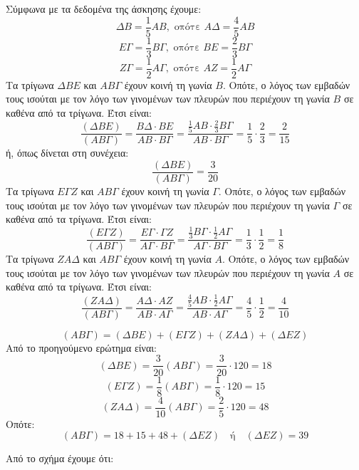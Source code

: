\begin{alist}
    \item Σύμφωνα με τα δεδομένα της άσκησης έχουμε:
    \[
    \Delta B = \frac{1}{5} AB, \text{ οπότε } A\Delta = \frac{4}{5} AB
    \]
    \[
    E\Gamma = \frac{1}{3} B\Gamma, \text{ οπότε } BE = \frac{2}{3} B\Gamma
    \]
    \[
    Z\Gamma = \frac{1}{2} A\Gamma, \text{ οπότε } AZ = \frac{1}{2} A\Gamma
    \]
    Τα τρίγωνα $\Delta BE$ και $AB\Gamma$ έχουν κοινή τη γωνία $B$. Οπότε, ο λόγος των εμβαδών τους ισούται με τον λόγο των γινομένων των πλευρών που περιέχουν τη γωνία $B$ σε καθένα από τα τρίγωνα. Έτσι είναι:
    \[
    \frac{(\Delta BE)}{(AB\Gamma)} = \frac{B\Delta \cdot BE}{AB \cdot B\Gamma} = \frac{\frac{1}{5}AB \cdot \frac{2}{3}B\Gamma}{AB \cdot B\Gamma} = \frac{1}{5} \cdot \frac{2}{3} = \frac{2}{15}
    \]
    ή, όπως δίνεται στη συνέχεια:
    \[
    \frac{(\Delta BE)}{(AB\Gamma)} = \frac{3}{20}
    \]
    Τα τρίγωνα $E\Gamma Z$ και $AB\Gamma$ έχουν κοινή τη γωνία $\Gamma$. Οπότε, ο λόγος των εμβαδών τους ισούται με τον λόγο των γινομένων των πλευρών που περιέχουν τη γωνία $\Gamma$ σε καθένα από τα τρίγωνα. Έτσι είναι:
    \[
    \frac{(E\Gamma Z)}{(AB\Gamma)} = \frac{E\Gamma \cdot \Gamma Z}{A\Gamma \cdot B\Gamma} = \frac{\frac{1}{3}B\Gamma \cdot \frac{1}{2}A\Gamma}{A\Gamma \cdot B\Gamma} = \frac{1}{3} \cdot \frac{1}{2} = \frac{1}{8}
    \]
    Τα τρίγωνα $ZA\Delta$ και $AB\Gamma$ έχουν κοινή τη γωνία $A$. Οπότε, ο λόγος των εμβαδών τους ισούται με τον λόγο των γινομένων των πλευρών που περιέχουν τη γωνία $A$ σε καθένα από τα τρίγωνα. Έτσι είναι:
    \[
    \frac{(ZA\Delta)}{(AB\Gamma)} = \frac{A\Delta \cdot AZ}{AB \cdot A\Gamma} = \frac{\frac{4}{5}AB \cdot \frac{1}{2}A\Gamma}{AB \cdot A\Gamma} = \frac{4}{5} \cdot \frac{1}{2} = \frac{4}{10}
    \]

    \[
    (AB\Gamma) = (\Delta BE) + (E\Gamma Z) + (ZA\Delta) + (\Delta EZ)
    \]
    Από το προηγούμενο ερώτημα είναι:
    \[
    (\Delta BE) = \frac{3}{20} (AB\Gamma) = \frac{3}{20} \cdot 120 = 18
    \]
    \[
    (E\Gamma Z) = \frac{1}{8} (AB\Gamma) = \frac{1}{8} \cdot 120 = 15
    \]
    \[
    (ZA\Delta) = \frac{4}{10} (AB\Gamma) = \frac{2}{5} \cdot 120 = 48
    \]
    Οπότε:
    \[
    (AB\Gamma) = 18 + 15 + 48 + (\Delta EZ) \quad \text{ή} \quad (\Delta EZ) = 39
    \]
    \item Από το σχήμα έχουμε ότι:
\end{alist}